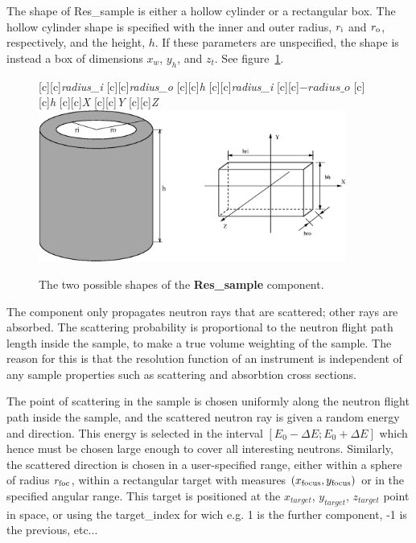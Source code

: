 The shape of {\rm Res\_sample} is either a hollow cylinder
or a rectangular box. 
The hollow cylinder shape is
specified with the inner and outer radius, $r_{\rm i}$ and $r_{\rm o}$,
respectively, and the height, $h$.
If these parameters are unspecified,
the shape is instead a box of dimensions $x_w$, $y_h$, and $z_t$.
See figure~\ref{f:res_sample}.\par
%
\begin{figure}[htbp]
  \begin{center}
        [c][c]{\textit{radius\_i}}
        [c][c]{\textit{radius\_o}}
        [c][c]{\textit{h}}
        [c][c]{\textit{radius\_i}}
        [c][c]{$-\textit{radius\_o}$}
        [c][c]{\textit{h}}
        [c][c]{\textit{X}}
        [c][c]{\textit{Y}}
        [c][c]{\textit{Z}}
        \includegraphics[width=0.9\textwidth]{figures/res_sample.eps}
    \caption{The two possible shapes of the \textbf{Res\_sample} component.}
    \label{f:res_sample}
  \end{center}
\end{figure}
%
The component only propagates neutron rays that are scattered; 
other rays are absorbed. The scattering probability is proportional to the neutron
flight path length inside the sample, to make a true volume weighting
of the sample. The reason for this is that the resolution
function of an instrument is independent of any sample properties 
such as scattering and absorbtion cross sections.

The point of scattering in the sample is chosen uniformly
along the neutron flight path inside the sample, and the scattered
neutron ray is given a random energy and direction. This energy is selected in
the interval $[E_0-\Delta E; E_0+\Delta E]$ which hence must be
chosen large enough to cover all interesting neutrons. Similarly, the scattered
direction is chosen in a user-specified range,
either within a sphere of radius $r_{\rm foc}$, within a rectangular
target with measures $(x_{\rm focus}, y_{\rm focus})$
or in the specified angular range. This target is positioned at the $x_{target}$, $y_{target}$, $z_{target}$ point in space, or using the target\_index for wich e.g. 1 is the further component, -1 is the previous, etc...

